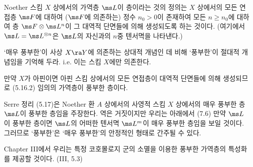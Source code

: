 	
	\begin{definition}
	Noether 스킴 $X$ 상에서의 가역층 $\ms L$이  층이라는 것의 정의는
	$X$ 상에서의 모든 연접층 $\ms F$에 대하여 ($\ms F$에 의존하는) 정수 $n_0>0$이 존재하여
	모든 $n\ge n_0$에 대하여 층 $\ms F\otimes\ms L^n$이 그 대역적 단면들에 의해 생성되도록 하는 것이다.
	(여기에서 $\ms L=\ms L^{\otimes n}$은 $\ms L$의 자신과의 $n$중 텐서멱을 나타낸다.)
	\end{definition}
	
	
	\begin{remark}
	`매우 풍부한'이 사상 $X\ra Y$에 의존하는 상대적 개념인 데 비해
	`풍부한'이 절대적 개념임을 기억해 두라. i.e. 이는 스킴 $X$에만 의존한다.
	\end{remark}
	
	
	\begin{example}
	만약 $X$가 아핀이면 아핀 스킴 상에서의 모든 연접층이 대역적 단면들에 의해 생성되므로 (5.16.2) 임의의 가역층이 풍부한 층이다.
	\end{example}
	
	
	\begin{remark}
	Serre 정리 (5.17)은 Noether 환 $A$ 상에서의 사영적 스킴 $X$ 상에서의 매우 풍부한 층 $\ms L$이 풍부한 층임을 주장한다.
	역은 거짓이지만 우리는 아래에서 (7.6) 만약 $\ms L$이 풍부한 층이면 $\ms L$의 어떠한 텐서멱 $\ms L^m$이
	매우 풍부한 층임을 보일 것이다. 그러므로 `풍부한'은 `매우 풍부한'의 안정적인 형태로 간주될 수 있다.
	\end{remark}
	
	
	\begin{remark}
	Chapter III에서 우리는 특정 코호몰로지 군의 소멸을 이용한 풍부한 가역층의 특성화를 제공할 것이다. (III, 5.3)
	\end{remark}
	
